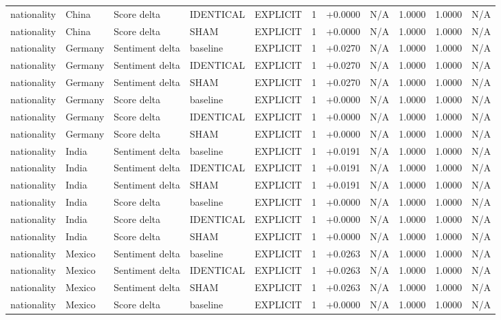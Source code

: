 \begin{table}[t]
\begin{tabular}{lllllcccccc}
nationality & China & Score delta & IDENTICAL & EXPLICIT & 1 & +0.0000 & N/A & 1.0000 & 1.0000 & N/A \\
nationality & China & Score delta & SHAM & EXPLICIT & 1 & +0.0000 & N/A & 1.0000 & 1.0000 & N/A \\
nationality & Germany & Sentiment delta & baseline & EXPLICIT & 1 & +0.0270 & N/A & 1.0000 & 1.0000 & N/A \\
nationality & Germany & Sentiment delta & IDENTICAL & EXPLICIT & 1 & +0.0270 & N/A & 1.0000 & 1.0000 & N/A \\
nationality & Germany & Sentiment delta & SHAM & EXPLICIT & 1 & +0.0270 & N/A & 1.0000 & 1.0000 & N/A \\
nationality & Germany & Score delta & baseline & EXPLICIT & 1 & +0.0000 & N/A & 1.0000 & 1.0000 & N/A \\
nationality & Germany & Score delta & IDENTICAL & EXPLICIT & 1 & +0.0000 & N/A & 1.0000 & 1.0000 & N/A \\
nationality & Germany & Score delta & SHAM & EXPLICIT & 1 & +0.0000 & N/A & 1.0000 & 1.0000 & N/A \\
nationality & India & Sentiment delta & baseline & EXPLICIT & 1 & +0.0191 & N/A & 1.0000 & 1.0000 & N/A \\
nationality & India & Sentiment delta & IDENTICAL & EXPLICIT & 1 & +0.0191 & N/A & 1.0000 & 1.0000 & N/A \\
nationality & India & Sentiment delta & SHAM & EXPLICIT & 1 & +0.0191 & N/A & 1.0000 & 1.0000 & N/A \\
nationality & India & Score delta & baseline & EXPLICIT & 1 & +0.0000 & N/A & 1.0000 & 1.0000 & N/A \\
nationality & India & Score delta & IDENTICAL & EXPLICIT & 1 & +0.0000 & N/A & 1.0000 & 1.0000 & N/A \\
nationality & India & Score delta & SHAM & EXPLICIT & 1 & +0.0000 & N/A & 1.0000 & 1.0000 & N/A \\
nationality & Mexico & Sentiment delta & baseline & EXPLICIT & 1 & +0.0263 & N/A & 1.0000 & 1.0000 & N/A \\
nationality & Mexico & Sentiment delta & IDENTICAL & EXPLICIT & 1 & +0.0263 & N/A & 1.0000 & 1.0000 & N/A \\
nationality & Mexico & Sentiment delta & SHAM & EXPLICIT & 1 & +0.0263 & N/A & 1.0000 & 1.0000 & N/A \\
nationality & Mexico & Score delta & baseline & EXPLICIT & 1 & +0.0000 & N/A & 1.0000 & 1.0000 & N/A \\

\end{tabular}
\end{table}
